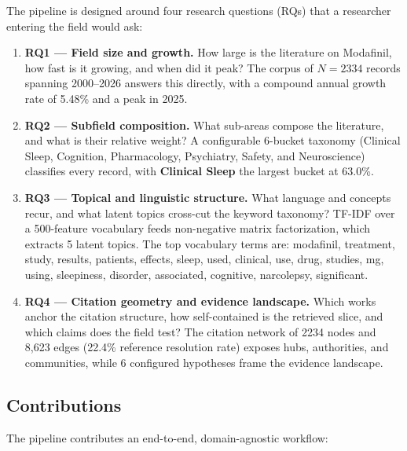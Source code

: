 \documentclass[
  english,
]{article}
\begin{document}
The pipeline is designed around four research questions (RQs) that a
researcher entering the field would ask:

\begin{enumerate}
\def\labelenumi{\arabic{enumi}.}
\item
  \textbf{RQ1 --- Field size and growth.} How large is the literature on
  Modafinil, how fast is it growing, and when did it peak? The corpus of
  \(N = 2334\) records spanning 2000--2026 answers this directly, with a
  compound annual growth rate of 5.48\% and a peak in 2025.
\item
  \textbf{RQ2 --- Subfield composition.} What sub-areas compose the
  literature, and what is their relative weight? A configurable 6-bucket
  taxonomy (Clinical Sleep, Cognition, Pharmacology, Psychiatry, Safety,
  and Neuroscience) classifies every record, with \textbf{Clinical
  Sleep} the largest bucket at 63.0\%.
\item
  \textbf{RQ3 --- Topical and linguistic structure.} What language and
  concepts recur, and what latent topics cross-cut the keyword taxonomy?
  TF-IDF over a 500-feature vocabulary feeds non-negative matrix
  factorization, which extracts 5 latent topics. The top vocabulary
  terms are: modafinil, treatment, study, results, patients, effects,
  sleep, used, clinical, use, drug, studies, mg, using, sleepiness,
  disorder, associated, cognitive, narcolepsy, significant.
\item
  \textbf{RQ4 --- Citation geometry and evidence landscape.} Which works
  anchor the citation structure, how self-contained is the retrieved
  slice, and which claims does the field test? The citation network of
  2234 nodes and 8,623 edges (22.4\% reference resolution rate) exposes
  hubs, authorities, and communities, while 6 configured hypotheses
  frame the evidence landscape.
\end{enumerate}

\subsection{Contributions}\label{contributions}

The pipeline contributes an end-to-end, domain-agnostic workflow:
\end{document}
